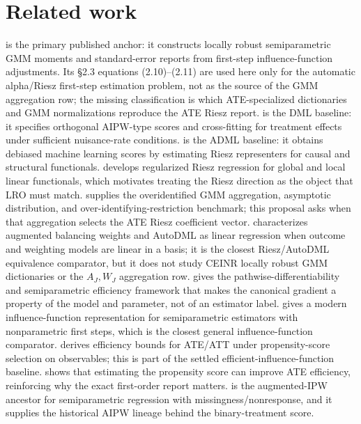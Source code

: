 \documentclass[11pt]{article}
\theoremstyle{definition}
\theoremstyle{plain}
\theoremstyle{remark}
\begin{document}
\section{Related work}
\citet[\S2, eqs.\ (2.2)--(2.3), and \S2, eq.\ (2.8)]{ChernozhukovEscancianoIchimuraNeweyRobins2022LRO} is the primary
published anchor: it constructs locally robust semiparametric GMM moments and
standard-error reports from first-step influence-function adjustments.  Its
\S2.3 equations (2.10)--(2.11) are used here only for the automatic
alpha/Riesz first-step estimation problem, not as the source of the GMM
aggregation row; the missing classification is which ATE-specialized
dictionaries and GMM normalizations reproduce the ATE Riesz report.
\citet{ChernozhukovEtAl2018DML} is the DML baseline: it
specifies orthogonal AIPW-type scores and cross-fitting for treatment effects
under sufficient nuisance-rate conditions.  \citet{ChernozhukovNeweySingh2022AutoDML}
is the ADML baseline: it obtains debiased machine learning scores by estimating
Riesz representers for causal and structural functionals.  \citet{ChernozhukovNeweySingh2022Riesz}
develops regularized Riesz regression for global and local linear functionals,
which motivates treating the Riesz direction as the object that LRO must match.
\citet[\S3--\S4]{Hansen1982Econometrica} supplies the overidentified GMM
aggregation, asymptotic distribution, and over-identifying-restriction
benchmark; this proposal asks when that aggregation selects the ATE Riesz
coefficient vector.  \citet{BrunsSmithDukesFellerOgburn2025ABW} characterizes
augmented balancing weights and AutoDML as linear regression when outcome and
weighting models are linear in a basis; it is the closest Riesz/AutoDML
equivalence comparator, but it does not study CEINR locally robust GMM
dictionaries or the \(A_J,W_J\) aggregation row.  \citet{Newey1994Econometrica} gives the
pathwise-differentiability and semiparametric efficiency framework that makes
the canonical gradient a property of the model and parameter, not of an
estimator label.  \citet{IchimuraNewey2022QE} gives a modern influence-function
representation for semiparametric estimators with nonparametric first steps,
which is the closest general influence-function comparator.  \citet{Hahn1998Econometrica}
derives efficiency bounds for ATE/ATT under propensity-score selection on
observables; this is part of the settled efficient-influence-function baseline.
\citet{HiranoImbensRidder2003Econometrica} shows that estimating the propensity
score can improve ATE efficiency, reinforcing why the exact first-order report
matters.  \citet{RobinsRotnitzkyZhao1994JASA} is the augmented-IPW ancestor for
semiparametric regression with missingness/nonresponse, and it supplies the
historical AIPW lineage behind the binary-treatment score.
\end{document}
